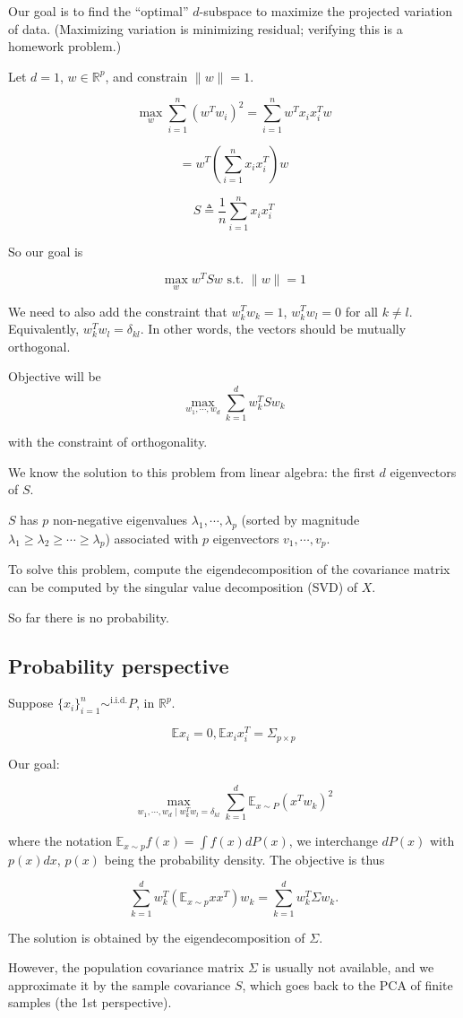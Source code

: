 \documentclass[12pt]{article}
\theoremstyle{plain}
\begin{document}
Our goal is to find the ``optimal'' $d$-subspace to maximize the projected variation of data. (Maximizing variation is minimizing residual; verifying this is a homework problem.)

Let $d=1$, $w \in \mathbb{R}^p$, and constrain $\|w \| = 1$.

$$ \max_w \sum_{i=1}^n (w^T w_i)^2  = \sum_{i=1}^n w^T x_i x_i^T w $$

$$ = w^T (\sum_{i=1}^n x_i x_i^T) w $$

$$ S \triangleq \frac{1}{n} \sum_{i=1}^n x_i x_i^T$$

So our goal is

$$ \max_w w^T S w \text{ s.t. } \| w \| = 1 $$

We need to also add the constraint that $w_k^T w_k = 1$, $w_k^T w_l = 0$ for all $k \neq l$. Equivalently, $w_k^T w_l = \delta_{kl}$. In other words, the vectors should be mutually orthogonal.

Objective will be $$\max_{w_1, \cdots, w_d}  \sum_{k=1}^d w_k^T S w_k$$

with the constraint of orthogonality.

We know the solution to this problem from linear algebra: the first $d$ eigenvectors of $S$.

$S$ has $p$ non-negative eigenvalues $\lambda_1, \cdots, \lambda_p$ (sorted by magnitude $\lambda_1 \geq \lambda_2 \geq \cdots \geq \lambda_p$) associated with $p$ eigenvectors $v_1, \cdots, v_p$.

To solve this problem, compute the eigendecomposition of the covariance matrix can be computed by the singular value decomposition (SVD) of $X$.

So far there is no probability.

\subsection*{Probability perspective}

Suppose $\{x_i \}_{i=1}^n \sim^{\text{i.i.d.}} P$, in $\mathbb{R}^p$.

$$ \mathbb{E} x_i = 0, \mathbb{E} x_i x_i^T = \Sigma_{p \times p} $$

Our goal:

$$ \max_{w_1, \cdots, w_d \mid w_k^T w_l = \delta_{kl}} \sum_{k=1}^d \mathbb{E}_{x \sim P} (x^T w_k)^2 $$

where the notation $ \mathbb{E}_{x \sim p} f(x) = \int f(x) dP(x) $, we interchange $dP(x)$ with $p(x)dx$, $p(x)$ being the probability density. The objective is thus

$$ \sum_{k=1}^d w_k^T (\mathbb{E}_{x \sim p} x x^T) w_k = \sum_{k=1}^d w_k^T \Sigma w_k.$$

The solution is obtained by the eigendecomposition of $\Sigma$. 

However, the population covariance matrix $\Sigma$ is usually not available, and we approximate it by the sample covariance $S$, which goes back to the PCA of finite samples (the 1st perspective).
\end{document}
